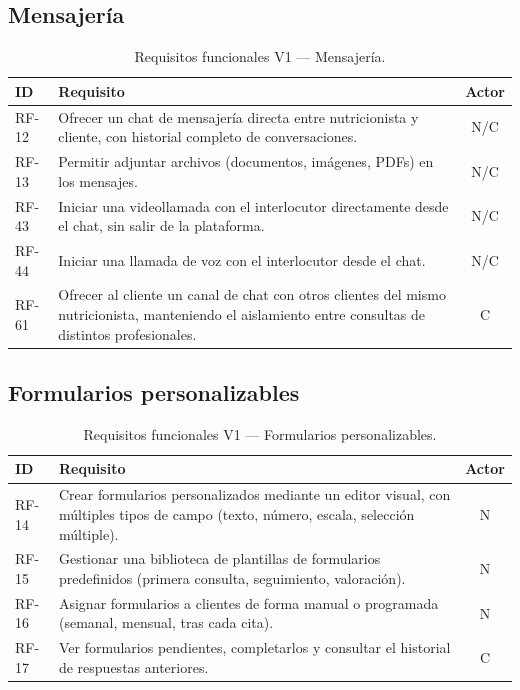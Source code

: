 \subsection{Mensajería}

\begin{table}[htbp]
\centering
\small
\begin{tabular}{|l|p{10.5cm}|c|}
\hline
\textbf{ID} & \textbf{Requisito} & \textbf{Actor} \\
\hline
RF-12 & Ofrecer un chat de mensajería directa entre nutricionista y cliente, con historial completo de conversaciones. & N/C \\
\hline
RF-13 & Permitir adjuntar archivos (documentos, imágenes, PDFs) en los mensajes. & N/C \\
\hline
RF-43 & Iniciar una videollamada con el interlocutor directamente desde el chat, sin salir de la plataforma. & N/C \\
\hline
RF-44 & Iniciar una llamada de voz con el interlocutor desde el chat. & N/C \\
\hline
RF-61 & Ofrecer al cliente un canal de chat con otros clientes del mismo nutricionista, manteniendo el aislamiento entre consultas de distintos profesionales. & C \\
\hline
\end{tabular}
\caption{Requisitos funcionales V1 --- Mensajería.}
\label{tab:rf-mensajeria-v1}
\end{table}

\subsection{Formularios personalizables}

\begin{table}[htbp]
\centering
\small
\begin{tabular}{|l|p{10.5cm}|c|}
\hline
\textbf{ID} & \textbf{Requisito} & \textbf{Actor} \\
\hline
RF-14 & Crear formularios personalizados mediante un editor visual, con múltiples tipos de campo (texto, número, escala, selección múltiple). & N \\
\hline
RF-15 & Gestionar una biblioteca de plantillas de formularios predefinidos (primera consulta, seguimiento, valoración). & N \\
\hline
RF-16 & Asignar formularios a clientes de forma manual o programada (semanal, mensual, tras cada cita). & N \\
\hline
RF-17 & Ver formularios pendientes, completarlos y consultar el historial de respuestas anteriores. & C \\
\hline
\end{tabular}
\caption{Requisitos funcionales V1 --- Formularios personalizables.}
\label{tab:rf-formularios-v1}
\end{table}


